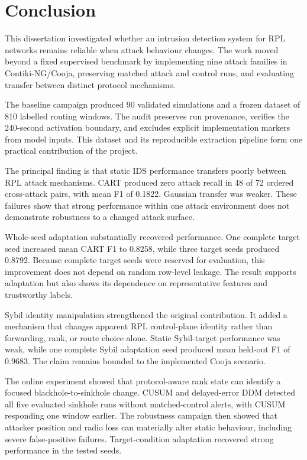 \chapter{Conclusion}
\label{chap:conclusion}

This dissertation investigated whether an intrusion detection system for RPL networks remains reliable when attack behaviour changes. The work moved beyond a fixed supervised benchmark by implementing nine attack families in Contiki-NG/Cooja, preserving matched attack and control runs, and evaluating transfer between distinct protocol mechanisms.

The baseline campaign produced 90 validated simulations and a frozen dataset of 810 labelled routing windows. The audit preserves run provenance, verifies the 240-second activation boundary, and excludes explicit implementation markers from model inputs. This dataset and its reproducible extraction pipeline form one practical contribution of the project.

The principal finding is that static IDS performance transfers poorly between RPL attack mechanisms. CART produced zero attack recall in 48 of 72 ordered cross-attack pairs, with mean F1 of 0.1822. Gaussian transfer was weaker. These failures show that strong performance within one attack environment does not demonstrate robustness to a changed attack surface.

Whole-seed adaptation substantially recovered performance. One complete target seed increased mean CART F1 to 0.8258, while three target seeds produced 0.8792. Because complete target seeds were reserved for evaluation, this improvement does not depend on random row-level leakage. The result supports adaptation but also shows its dependence on representative features and trustworthy labels.

Sybil identity manipulation strengthened the original contribution. It added a mechanism that changes apparent RPL control-plane identity rather than forwarding, rank, or route choice alone. Static Sybil-target performance was weak, while one complete Sybil adaptation seed produced mean held-out F1 of 0.9683. The claim remains bounded to the implemented Cooja scenario.

The online experiment showed that protocol-aware rank state can identify a focused blackhole-to-sinkhole change. CUSUM and delayed-error DDM detected all five evaluated sinkhole runs without matched-control alerts, with CUSUM responding one window earlier. The robustness campaign then showed that attacker position and radio loss can materially alter static behaviour, including severe false-positive failures. Target-condition adaptation recovered strong performance in the tested seeds.

